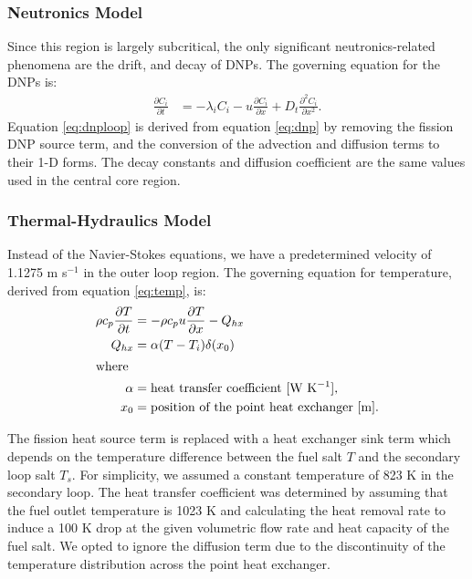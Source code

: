 \subsubsection{Neutronics Model}

Since this region is largely subcritical, the only significant
neutronics-related phenomena are the drift, and decay of \glspl{DNP}.
The governing equation for the \glspl{DNP} is:
%
\begin{align}
    \frac{\partial C_i}{\partial t} &= - \lambda_i C_i - u
    \frac{\partial C_i}{\partial x} + D_t \frac{\partial^2 C_i}{\partial x^2}.
    \label{eq:dnploop}
\end{align}
%
Equation \ref{eq:dnploop} is derived from equation \ref{eq:dnp} by removing
the fission \gls{DNP} source term, and the conversion of the advection and
diffusion terms to their 1-D forms. The decay constants and diffusion
coefficient are the same values used in the central core region.

\subsubsection{Thermal-Hydraulics Model}

Instead of the Navier-Stokes equations, we have a predetermined velocity of
1.1275 m s$^{-1}$ in the outer loop region. The governing equation for
temperature, derived from equation \ref{eq:temp}, is:
%
\begin{align}
    \rho c_{p} \frac{\partial T}{\partial t} &= - \rho c_p u
    \frac{\partial T}{\partial x} - Q_{hx} \label{eq:temploop} \\
    Q_{hx} &= \alpha (T - T_i) \delta (x_0) \label{eq:hx} \\
    \intertext{where}
    \alpha &= \text{heat transfer coefficient [W K$^{-1}$],} \nonumber \\
    x_0 &= \text{position of the point heat exchanger [m].} \nonumber
\end{align}

The fission heat source term is replaced with a heat exchanger sink term
which depends on the temperature difference between the fuel salt $T$ and the
secondary loop salt $T_s$. For simplicity, we assumed a constant temperature
of 823 K in the secondary loop. The heat transfer coefficient was determined
by assuming that the fuel outlet temperature is 1023 K and calculating the
heat removal rate to induce a 100 K drop at the given volumetric flow rate
and heat capacity of the fuel salt. We opted to ignore the diffusion term due
to the discontinuity of the temperature distribution across the point heat
exchanger. 

